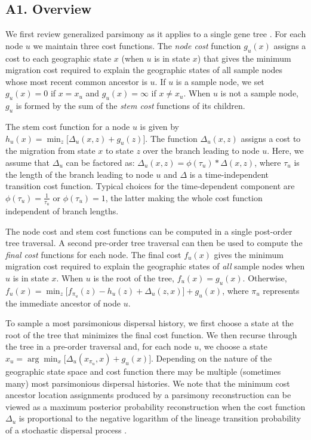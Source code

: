 \subsection*{A1. Overview}

We first review generalized parsimony as it applies to a single gene tree
\citep{Sankoff_1975, Sankoff_Rousseau_1975}. For each node $u$ we maintain
three cost functions. The \textit{node cost} function $g_u(x)$ assigns a cost
to each geographic state $x$ (when $u$ is in state $x$) that gives the minimum
migration cost required to explain the geographic states of all sample nodes
whose most recent common ancestor is $u$. If $u$ is a sample node, we set
$g_u(x) = 0$ if $x = x_u$ and $g_u(x) = \infty$ if $x \neq x_u$. When $u$ is 
not a sample node, $g_u$ is formed by the sum of the \textit{stem cost}
functions of its children.

The stem cost function for a node $u$ is given by
%
$h_u(x) = \min_z \bigl[ \Delta_u(x, z) + g_u(z) \bigr]$.
%
The function $\Delta_u(x, z)$ assigns a cost to the migration from state $x$ to
state $z$ over the branch leading to node $u$. Here, we assume that $\Delta_u$
can be factored as:
%
$\Delta_u(x,z) = \phi(\tau_u) * \Delta(x,z)$,
%
where $\tau_u$ is the length of the branch leading to node $u$ and $\Delta$ is
a time-independent transition cost function. Typical choices for the
time-dependent component are $\phi(\tau_u) = \frac{1}{\tau_u}$ or 
$\phi(\tau_u) = 1$, the latter making the whole cost function independent of
branch lengths.

The node cost and stem cost functions can be computed in a single post-order
tree traversal. A second pre-order tree traversal can then be used to compute
the \textit{final cost} functions for each node. The final cost $f_u(x)$
gives the minimum migration cost required to explain the geographic states of
\emph{all} sample nodes when $u$ is in state $x$. When $u$ is the root of the
tree, $f_u(x) = g_u(x)$. Otherwise, 
%
$f_u(x) = \min_z \bigl[ f_{\pi_u}(z) - h_u(z) + \Delta_u(z,x) \bigr] + g_u(x)$,
%
where $\pi_u$ represents the immediate ancestor of node $u$.

\iffalse
To sample a most parsimonious dispersal history, we first choose a state at the
root of the tree that minimizes the final cost function. We then recurse through 
the tree in a pre-order traversal and, for each node $u$, we choose a state
$x_u = \arg\min_x \bigl[\Delta_u(x_{\pi_u}, x) + g_u(x)\bigr]$. Depending on the
nature of the geographic state space and cost function there may be multiple
(sometimes many) most parsimonious dispersal histories. We note that the 
minimum cost ancestor location assignments produced by a parsimony 
reconstruction can be viewed as a maximum posterior probability reconstruction 
when the cost function $\Delta_u$ is proportional to the negative logarithm of 
the lineage transition probability of a stochastic dispersal process 
\citep{Maddison_1991}.

